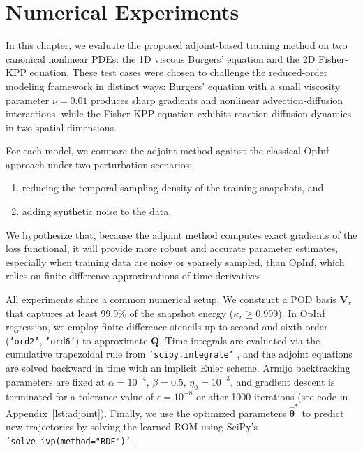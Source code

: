 \chapter{Numerical Experiments}
\label{chap:numexp}

In this chapter, we evaluate the proposed adjoint-based training method on two canonical nonlinear PDEs: the 1D viscous Burgers’ equation and the 2D Fisher-KPP equation. These test cases were chosen to challenge the reduced-order modeling framework in distinct ways: Burgers’ equation with a small viscosity parameter $\nu=0.01$ produces sharp gradients and nonlinear advection-diffusion interactions, while the Fisher-KPP equation exhibits reaction-diffusion dynamics in two spatial dimensions.  

For each model, we compare the adjoint method against the classical OpInf approach under two perturbation scenarios:
\begin{enumerate}[label=(\roman*)]
  \item reducing the temporal sampling density of the training snapshots, and
  \item adding synthetic noise to the data.
\end{enumerate}
We hypothesize that, because the adjoint method computes exact gradients of the loss functional, it will provide more robust and accurate parameter estimates, especially when training data are noisy or sparsely sampled, than OpInf, which relies on finite-difference approximations of time derivatives.  

All experiments share a common numerical setup. We construct a POD basis $\mathbf{V}_r$ that captures at least $99.9\%$ of the snapshot energy ($\kappa_r\ge0.999$). In OpInf regression, we employ finite-difference stencils up to second and sixth order (\texttt{'ord2'}, \texttt{'ord6'}) to approximate $\dot{\mathbf{Q}}$. Time integrals are evaluated via the cumulative trapezoidal rule from \texttt{'scipy.integrate'} \cite{virtanen2020scipy}, and the adjoint equations are solved backward in time with an implicit Euler scheme. Armijo backtracking parameters are fixed at $\alpha=10^{-4}$, $\beta=0.5$, $\eta_0=10^{-3}$, and gradient descent is terminated for a tolerance value of $\epsilon=10^{-8}$ or after 1000 iterations (see code in  Appendix~\ref{lst:adjoint}). Finally, we use the optimized parameters $\hat{\bm\theta}^*$ to predict new trajectories by solving the learned ROM using SciPy's \texttt{'solve\_ivp(method="BDF")'} \cite{scipy-solveivp}.



